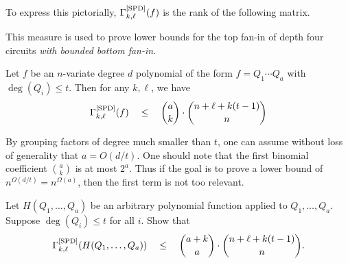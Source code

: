 \noindent
To express this pictorially, $\Gamma^{\mathrm{[SPD]}}_{k,\ell}(f)$ is the rank of the following matrix. 


This measure is used to prove lower bounds for the top fan-in of depth four circuits \emph{with bounded bottom fan-in}. 

\begin{lemma*}
Let $f$ be an $n$-variate degree $d$ polynomial of the form $f = Q_1 \cdots Q_a$ with $\deg(Q_i) \leq t$. Then for any $k,\ell$, we have
\[
\Gamma^{\mathrm{[SPD]}}_{k,\ell}(f) \quad \leq \quad \binom{a}{k} \cdot \binom{n + \ell + k(t-1)}{n}
\]
\end{lemma*}

By grouping factors of degree much smaller than $t$, one can assume without loss of generality that $a = O(d/t)$.
One should note that the first binomial coefficient $\binom{a}{k}$ is at most $2^a$.
Thus if the goal is to prove a lower bound of $n^{\Omega(d/t)} = n^{\Omega(a)}$, then the first term is not too relevant. \\

\begin{exercise}
Let $H(Q_1,\ldots, Q_a)$ be an arbitrary polynomial function applied to $Q_1,\ldots, Q_a$. Suppose $\deg(Q_i) \leq t$ for all $i$. Show that
\[
\Gamma^{\mathrm{[SPD]}}_{k,\ell}(H(Q_1,\ldots, Q_a)) \quad \leq \quad \binom{a+k}{a} \cdot \binom{n + \ell + k(t-1)}{n}.
\]
\end{exercise}

